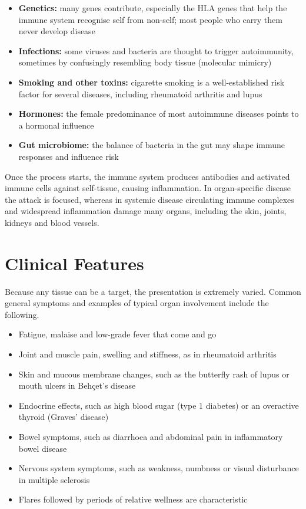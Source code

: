 \begin{itemize}
    \item \textbf{Genetics:} many genes contribute, especially the HLA genes that help the immune system recognise self from non-self; most people who carry them never develop disease
    \item \textbf{Infections:} some viruses and bacteria are thought to trigger autoimmunity, sometimes by confusingly resembling body tissue (molecular mimicry)
    \item \textbf{Smoking and other toxins:} cigarette smoking is a well-established risk factor for several diseases, including rheumatoid arthritis and lupus
    \item \textbf{Hormones:} the female predominance of most autoimmune diseases points to a hormonal influence
    \item \textbf{Gut microbiome:} the balance of bacteria in the gut may shape immune responses and influence risk
\end{itemize}

Once the process starts, the immune system produces antibodies and activated immune cells against self-tissue, causing inflammation. In organ-specific disease the attack is focused, whereas in systemic disease circulating immune complexes and widespread inflammation damage many organs, including the skin, joints, kidneys and blood vessels.

\section*{Clinical Features}
Because any tissue can be a target, the presentation is extremely varied. Common general symptoms and examples of typical organ involvement include the following.

\begin{itemize}
    \item Fatigue, malaise and low-grade fever that come and go
    \item Joint and muscle pain, swelling and stiffness, as in rheumatoid arthritis
    \item Skin and mucous membrane changes, such as the butterfly rash of lupus or mouth ulcers in Beh\c{c}et's disease
    \item Endocrine effects, such as high blood sugar (type 1 diabetes) or an overactive thyroid (Graves' disease)
    \item Bowel symptoms, such as diarrhoea and abdominal pain in inflammatory bowel disease
    \item Nervous system symptoms, such as weakness, numbness or visual disturbance in multiple sclerosis
    \item Flares followed by periods of relative wellness are characteristic
\end{itemize}

